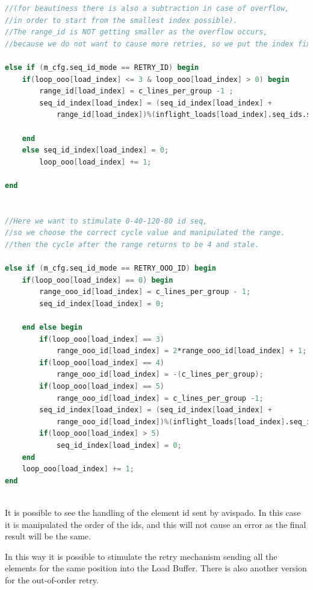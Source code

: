 \linespread{1}
\begin{lstlisting}[language=Verilog,style=verilog-style, backgroundcolor=\color{lyel_palette}, frame=tlb]
//(for beautiness there is also a subtraction in case of overflow, 
//in order to start from the smallest index possible).
//The range_id is NOT getting smaller as the overflow occurs, 
//because we do not want to cause more retries, so we put the index fixed to 0

else if (m_cfg.seq_id_mode == RETRY_ID) begin
    if(loop_ooo[load_index] <= 3 & loop_ooo[load_index] > 0) begin
        range_id[load_index] = c_lines_per_group -1 ;
        seq_id_index[load_index] = (seq_id_index[load_index] +
            range_id[load_index])%(inflight_loads[load_index].seq_ids.size());
            
    end
    else seq_id_index[load_index] = 0;
        loop_ooo[load_index] += 1;
        
end


//Here we want to stimulate 0-40-120-80 id seq, 
//so we choose the correct cycle value and manipulated the range.
//then the cycle after the range returns to be 4 and stale.

else if (m_cfg.seq_id_mode == RETRY_OOO_ID) begin
    if(loop_ooo[load_index] == 0) begin
        range_ooo_id[load_index] = c_lines_per_group - 1;
        seq_id_index[load_index] = 0;

    end else begin
        if(loop_ooo[load_index] == 3) 
            range_ooo_id[load_index] = 2*range_ooo_id[load_index] + 1;
        if(loop_ooo[load_index] == 4) 
            range_ooo_id[load_index] = -(c_lines_per_group);
        if(loop_ooo[load_index] == 5) 
            range_ooo_id[load_index] = c_lines_per_group -1;
        seq_id_index[load_index] = (seq_id_index[load_index] +
            range_ooo_id[load_index])%(inflight_loads[load_index].seq_ids.size());
        if(loop_ooo[load_index] > 5) 
            seq_id_index[load_index] = 0;
    end
    loop_ooo[load_index] += 1;
end



\end{lstlisting}
\linespread{1.2}

It is possible to see the handling of the element id sent by avispado. In this case it is manipulated the order of the ids, and this will not cause an error as the final result will be the same.

In this way it is possible to stimulate the retry mechanism sending all the elements for the same position into the Load Buffer. There is also another version for the out-of-order retry.

